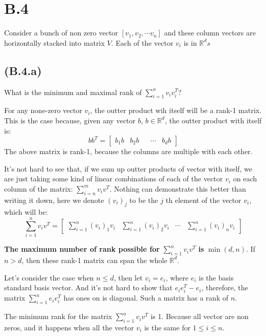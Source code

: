 \documentclass[]{article}
\begin{document}
\section*{B.4}
    Consider a bunch of non zero vector $[v_1, v_2, \cdots v_n]$ and these column vectors are horizontally stacked into matrix $V$. Each of the vector $v_i$ is in $\mathbb{R}^ds$
    \subsection*{(B.4.a)}
        \hspace{1.1em}
        What is the minimum and maximal rank of $\sum_{i = 1}^{n}v_iv_i^T$? 
        \par
        For any none-zero vector $v_i$, the outter product wih itself will be a rank-1 matrix. This is the case because, given any vector $b$, $b\in \mathbb{R}^d$, the outter product with itself is: 
        \begin{equation*}\tag{B.4.a.1}\label{eqn:B.4.a.1}
            bb^T = \begin{bmatrix}
                b_1b & b_2b & & \cdots & b_d b
            \end{bmatrix}
        \end{equation*} 
        The above matrix is rank-1, because the columns are multiple with each other. 
        \par
        It's not hard to see that, if we sum up outter products of vector with itself, we are just taking some kind of linear combinations of each of the vector $v_i$ on each column of the matrix: $\sum_{i = n}^{m}v_iv^T$. Nothing can demonstrate this better than writing it down, here we denote $(v_i)_j$ to be the $j$ th element of the vector $v_i$, which will be: 
        \begin{equation*}\tag{B.4.a.2}\label{eqn:B.4.a.2}
            \sum_{i = 1}^{n}v_iv^T
            =
            \begin{bmatrix}
                \sum_{i = 1}^{n} (v_i)_1v_i 
                & 
                \sum_{i = 1}^{n} (v_i)_2v_i
                & 
                \cdots 
                & 
                \sum_{i = 1}^{n}(v_i)_nv_i
            \end{bmatrix}
        \end{equation*}
        \par
        \textbf{The maximum number of rank possible for} $\sum_{i = 1}^nv_iv^T$ \textbf{is} $\min(d, n)$. If $n> d$, then these rank-1 matrix can span the whole $\mathbb{R}^d$. 
        \par
        Let's consider the case when $n \le d$, then let $v_i = e_i$, where $e_i$ is the basis standard basis vector. And it's not hard to show that $e_ie_i^T - e_i$, therefore, the matrix $\sum_{i = 1}^{n}e_i e_i^T$ has ones on is diagonal. Such a matrix has a rank of $n$. 
        \par
        The minimum rank for the matrix $\sum_{i = 1}^{n}v_iv^T$ is 1. Because all vector are non zeros, and it happens when all the vector $v_i$ is the same for $1 \le i \le n$.
\end{document}

